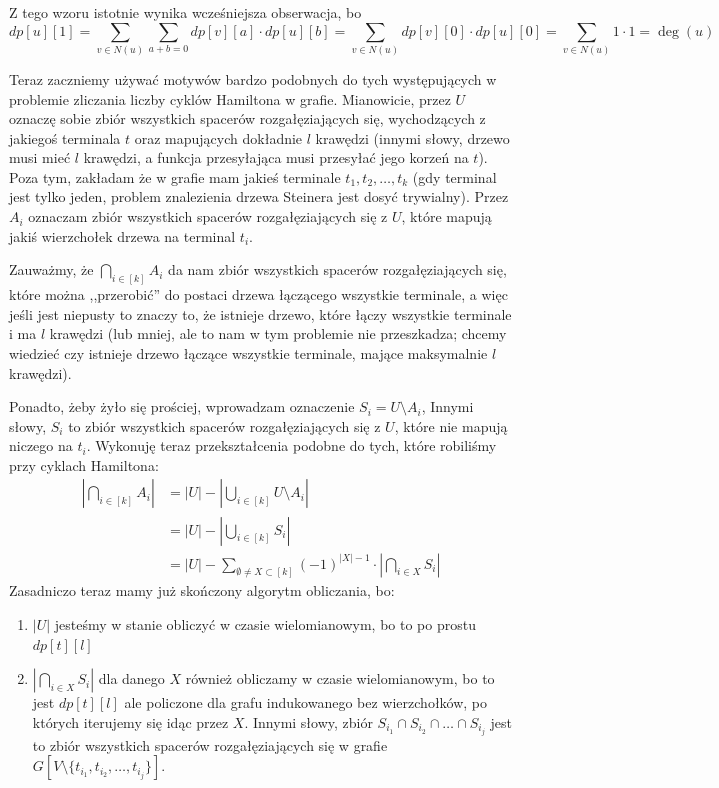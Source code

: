     Z tego wzoru istotnie wynika wcześniejsza obserwacja, bo \begin{equation*}
        dp[u][1] = \sum_{v \in N(u)}\sum_{a+b = 0} dp[v][a] \cdot dp[u][b] = \sum_{v \in N(u)} dp[v][0] \cdot dp[u][0] = \sum_{v \in N(u)} 1 \cdot 1 = \deg(u)
    \end{equation*}

    Teraz zaczniemy używać motywów bardzo podobnych do tych występujących w problemie zliczania liczby cyklów Hamiltona w grafie. Mianowicie, przez $U$ oznaczę sobie zbiór wszystkich spacerów rozgałęziających się, wychodzących z jakiegoś terminala $t$ oraz mapujących dokładnie $l$ krawędzi (innymi słowy, drzewo musi mieć $l$ krawędzi, a funkcja przesyłająca musi przesyłać jego korzeń na $t$). Poza tym, zakładam że w grafie mam jakieś terminale $t_1, t_2, \dots, t_k$ (gdy terminal jest tylko jeden, problem znalezienia drzewa Steinera jest dosyć trywialny). Przez $A_i$ oznaczam zbiór wszystkich spacerów rozgałęziających się z $U$, które mapują jakiś wierzchołek drzewa na terminal $t_i$.
    
    Zauważmy, że $\bigcap_{i \in [k]} A_i $ da nam zbiór wszystkich spacerów rozgałęziających się, które można ,,przerobić'' do postaci drzewa łączącego wszystkie terminale, a więc jeśli jest niepusty to znaczy to, że istnieje drzewo, które łączy wszystkie terminale i ma $l$ krawędzi (lub mniej, ale to nam w tym problemie nie przeszkadza; chcemy wiedzieć czy istnieje drzewo łączące wszystkie terminale, mające maksymalnie $l$ krawędzi).
    
    Ponadto, żeby żyło się prościej, wprowadzam oznaczenie $S_i = U \setminus A_i$, Innymi słowy, $S_i$ to zbiór wszystkich spacerów rozgałęziających się z $U$, które nie mapują niczego na $t_i$. Wykonuję teraz przekształcenia podobne do tych, które robiliśmy przy cyklach Hamiltona:
    \begin{equation*}
        \begin{split}
            |\bigcap_{i \in [k]} A_i|
                &= |U| - |\bigcup_{i \in [k]} U \setminus A_i|\\
                &= |U| - |\bigcup_{i \in [k]} S_i|\\
                &= |U| - \sum_{\emptyset \not = X \subset [k]} (-1)^{|X| - 1} \cdot |\bigcap_{i \in X} S_i|
        \end{split}
    \end{equation*}
    Zasadniczo teraz mamy już skończony algorytm obliczania, bo:
    \begin{enumerate}
        \item $|U|$ jesteśmy w stanie obliczyć w czasie wielomianowym, bo to po prostu $dp[t][l]$
        \item $|\bigcap_{i \in X} S_i|$ dla danego $X$ również obliczamy w czasie wielomianowym, bo to jest $dp[t][l]$ ale policzone dla grafu indukowanego bez wierzchołków, po których iterujemy się idąc przez $X$. Innymi słowy, zbiór $S_{i_1} \cap S_{i_2} \cap \dots \cap S_{i_j}$ jest to zbiór wszystkich spacerów rozgałęziających się w grafie $G [V \setminus \{t_{i_1}, t_{i_2}, \dots, t_{i_j}\}] $.
    \end{enumerate}